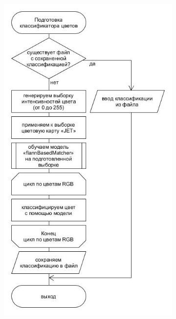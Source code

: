 \documentclass[t]{beamer}
\begin{document}
	\begin{frame}
		
		\begin{figure}[ht!]
			\begin{subfigure}{.31\textwidth}
				\centering
				\includegraphics[width = \textwidth]{image/chapter_2/colorclassification}
				\caption{}
			\end{subfigure}
			\begin{subfigure}{.17\textwidth}

\end{subfigure}
\end{figure}
\end{frame}
\end{document}
